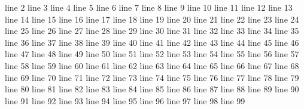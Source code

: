 \this\is\a\fake\tex\file
line 2
line 3
line 4
line 5
line 6
line 7
line 8
line 9
line 10
line 11
line 12
line 13
line 14
line 15
line 16
line 17
line 18
line 19
line 20
line 21
line 22
line 23
line 24
line 25
line 26
line 27
line 28
line 29
line 30
line 31
line 32
line 33
line 34
line 35
line 36
line 37
line 38
line 39
line 40
line 41
line 42
line 43
line 44
line 45
line 46
line 47
line 48
line 49
line 50
line 51
line 52
line 53
line 54
line 55
line 56
line 57
line 58
line 59
line 60
line 61
line 62
line 63
line 64
line 65
line 66
line 67
line 68
line 69
line 70
line 71
line 72
line 73
line 74
line 75
line 76
line 77
line 78
line 79
line 80
line 81
line 82
line 83
line 84
line 85
line 86
line 87
line 88
line 89
line 90
line 91
line 92
line 93
line 94
line 95
line 96
line 97
line 98
line 99
